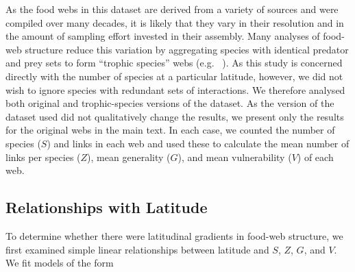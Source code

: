 \documentclass[12pt]{article}
\begin{document}


As the food webs in this dataset are derived from a variety of sources and were compiled over many decades, it
is likely that they vary in their resolution and in the amount of sampling effort invested in their assembly.
Many analyses of food-web structure reduce this variation by aggregating species with identical predator and prey
sets to form ``trophic species'' webs (e.g. ~\citep{Martinez1991,Vermaat2009,Dunne2004,Dunne2013}). As this study
is concerned directly with the number of species at a particular latitude, however, we did not wish to ignore 
species with redundant sets of interactions. We therefore analysed both original and trophic-species versions
of the dataset. As the version of the dataset used did not qualitatively change the results, we present only
the results for the original webs in the main text. In each case, we counted the number of species ($S$) and 
links in each web and used these to calculate the mean number of links per species ($Z$), mean generality 
($G$), and mean vulnerability ($V$) of each web. 


\subsection*{Relationships with Latitude}

To determine whether there were latitudinal gradients in food-web structure,
we first examined simple linear relationships between latitude and $S$, $Z$, $G$, and $V$. 
We fit models of the form
\end{document}
